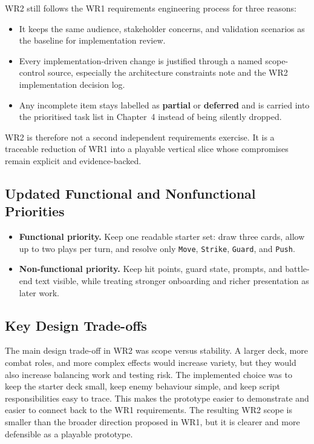 WR2 still follows the WR1 requirements engineering process for three reasons:

\begin{itemize}
\item It keeps the same audience, stakeholder concerns, and validation scenarios as the baseline for implementation review.
\item Every implementation-driven change is justified through a named scope-control source, especially the architecture constraints note and the WR2 implementation decision log.
\item Any incomplete item stays labelled as \textbf{partial} or \textbf{deferred} and is carried into the prioritised task list in Chapter~4 instead of being silently dropped.
\end{itemize}

WR2 is therefore not a second independent requirements exercise. It is a traceable reduction of WR1 into a playable vertical slice whose compromises remain explicit and evidence-backed.

\subsection{Updated Functional and Nonfunctional Priorities}

\begin{itemize}
\item \textbf{Functional priority.} Keep one readable starter set: draw three cards, allow up to two plays per turn, and resolve only \texttt{Move}, \texttt{Strike}, \texttt{Guard}, and \texttt{Push}.
\item \textbf{Non-functional priority.} Keep hit points, guard state, prompts, and battle-end text visible, while treating stronger onboarding and richer presentation as later work.
\end{itemize}

\subsection{Key Design Trade-offs}

The main design trade-off in WR2 was scope versus stability. A larger deck, more combat roles, and more complex effects would increase variety, but they would also increase balancing work and testing risk. The implemented choice was to keep the starter deck small, keep enemy behaviour simple, and keep script responsibilities easy to trace. This makes the prototype easier to demonstrate and easier to connect back to the WR1 requirements. The resulting WR2 scope is smaller than the broader direction proposed in WR1, but it is clearer and more defensible as a playable prototype.

